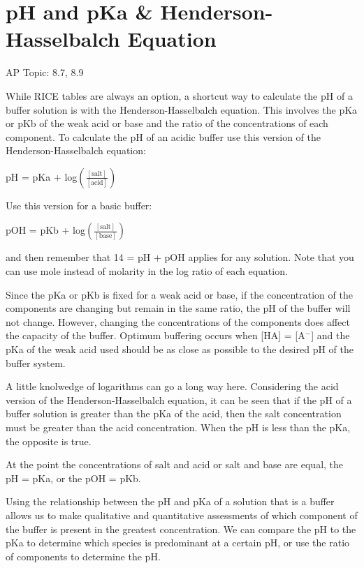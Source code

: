 \documentclass[../chem.tex]{subfiles}
\begin{document}
\section{pH and pKa \& Henderson-Hasselbalch Equation}
AP Topic: 8.7, 8.9

While RICE tables are always an option, a shortcut way to calculate the pH of a buffer solution is with the Henderson-Hasselbalch equation.
This involves the pKa or pKb of the weak acid or base and the ratio of the concentrations of each component. To calculate the pH of an acidic buffer use this version of the 
Henderson-Hasselbalch equation:
\begin{center}
    pH = pKa + log$\left(\frac{[\text{salt}]}{[\text{acid}]}\right)$
\end{center}

Use this version for a basic buffer:
\begin{center}
    pOH = pKb + log$\left(\frac{[\text{salt}]}{[\text{base}]}\right)$
\end{center}
and then remember that 14 = pH + pOH applies for any solution. Note that you can use mole instead of molarity in the log ratio of each equation.

Since the pKa or pKb is fixed for a weak acid or base, if the concentration of the components are changing but remain in the same ratio, the pH of the buffer will not change.
However, changing the concentrations of the components does affect the capacity of the buffer. Optimum buffering occurs when [HA] = [A$^-$] and the pKa 
of the weak acid used should be as close as possible to the desired pH of the buffer system.

A little knolwedge of logarithms can go a long way here. Considering the acid version of the Henderson-Hasselbalch equation, it can be seen that if the pH of a buffer 
solution is greater than the pKa of the acid, then the salt concentration must be greater than the acid concentration. When the pH is less than the pKa, the opposite is true.

At the point the concentrations of salt and acid or salt and base are equal, the pH = pKa, or the pOH = pKb.

Using the relationship between the pH and pKa of a solution that is a buffer allows us to make qualitative and quantitative assessments of which component of the buffer is present in the 
greatest concentration. We can compare the pH to the pKa to determine which species is predominant at a certain pH, or use the ratio of components to determine the pH.
\end{document}
